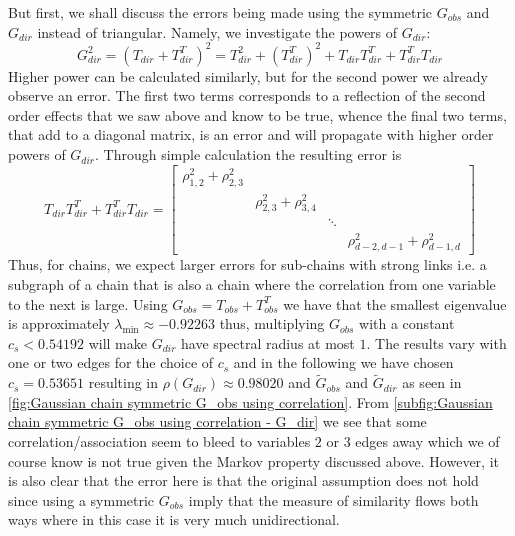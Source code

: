 \documentclass[../Thesis.tex]{subfiles}
\begin{document}
But first, we shall discuss the errors being made using the symmetric $G_{obs}$ and $G_{dir}$ instead of triangular. Namely, we investigate the powers of $G_{dir}$:
$$G_{dir}^2 = \left(T_{dir} + T_{dir}^T\right)^2 = T_{dir}^2 + \left(T_{dir}^T\right)^2 + T_{dir} T_{dir}^T + T_{dir}^T T_{dir}$$
Higher power can be calculated similarly, but for the second power we already observe an error. The first two terms corresponds to a reflection of the second order effects that we saw above and know to be true, whence the final two terms, that add to a diagonal matrix, is an error and will propagate with higher order powers of $G_{dir}$. Through simple calculation the resulting error is
$$T_{dir} T_{dir}^T + T_{dir}^T T_{dir} = \begin{bmatrix}
        \rho_{1,2}^2 + \rho_{2,3}^2 &                             &        &                                   \\
                                    & \rho_{2,3}^2 + \rho_{3,4}^2 &        &                                   \\
                                    &                             & \ddots &                                   \\
                                    &                             &        & \rho_{d-2,d-1}^2 + \rho_{d-1,d}^2
    \end{bmatrix}$$
Thus, for chains, we expect larger errors for sub-chains with strong links i.e. a subgraph of a chain that is also a chain where the correlation from one variable to the next is large. Using $G_{obs} = T_{obs} + T_{obs}^T$ we have that the smallest eigenvalue is approximately $\lambda_{\min} \approx -0.92263$ thus, multiplying $G_{obs}$ with a constant $c_s < 0.54192$ will make $G_{dir}$ have spectral radius at most $1$. The results vary with one or two edges for the choice of $c_s$ and in the following we have chosen $c_s = 0.53651$ resulting in $\rho\left(G_{dir}\right) \approx 0.98020$ and $\tilde{G}_{obs}$ and $\tilde{G}_{dir}$ as seen in \autoref{fig:Gaussian chain symmetric G_obs using correlation}. From \autoref{subfig:Gaussian chain symmetric G_obs using correlation - G_dir} we see that some correlation/association seem to bleed to variables $2$ or $3$ edges away which we of course know is not true given the Markov property discussed above. However, it is also clear that the error here is that the original assumption does not hold since using a symmetric $G_{obs}$ imply that the measure of similarity flows both ways where in this case it is very much unidirectional.
\end{document}
